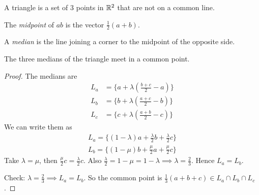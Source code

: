\documentclass[10pt]{scrartcl}
\begin{document}
\vsp
\begin{definition}
A triangle is a set of $3$ points in $\mathbb{R}^2$ that are not on a common line.	
\end{definition}
\begin{center}
\end{center}

\begin{definition}[Midpoint]
The \emph{midpoint} of $ab$ is the vector $\frac{1}{2}(a+b)$.	
\end{definition}

\begin{definition}[Median]
A \emph{median} is the line joining a corner to the midpoint of the opposite side.
\end{definition}\vsp

\begin{proposition}
The three medians of the triangle meet in a common point.	
\end{proposition}

\begin{proof}
The medians are 
\begin{align*}
  L_a &=\textstyle{ \{a + \lambda(\frac{b+c}{2} -a )\}}\\
  L_b &=\textstyle{ \{b + \lambda(\frac{a+c}{2} -b )\}}\\
  L_c &=\textstyle{ \{c + \lambda(\frac{a+b}{2} -c )\}}
\end{align*}	
We can write them as
\begin{align*}
  L_a =\{ \textstyle{(1-\lambda)a + \frac{\lambda}{2}b + \frac{\lambda}{2}c\}}\\
  L_b = \{\textstyle{(1-\mu)b + \frac{\mu}{2}a + \frac{\mu}{2}c}\}
\end{align*}
Take $\lambda = \mu$, then $\frac{\mu}{2}c = \frac{\lambda}{2}c$. Also $\frac{\lambda}{2} = 1-\mu = 1-\lambda \implies \lambda = \frac{2}{3}$. Hence $L_a = L_b$. 

Check: $\lambda = \frac{2}{3} \implies L_a = L_b$. So the common point is $\frac{1}{3}(a + b + c) \in L_a \cap L_b \cap L_c$. 
\end{proof}\vsp
\end{document}

